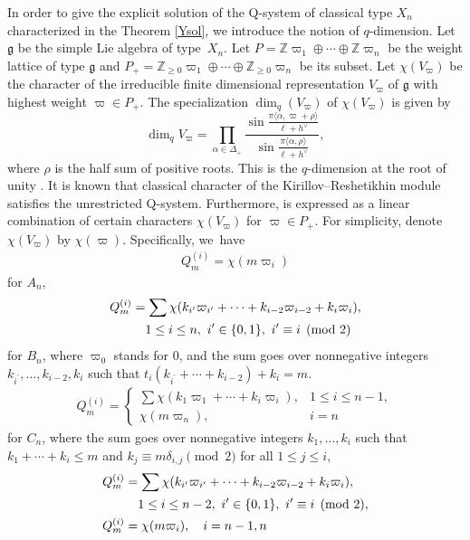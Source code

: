 \documentclass[pdftex]{sigma}
\numberwithin{equation}{section}
\newcommand{\Z}{{\mathbb Z}}
\newcommand{\geh}{\mathfrak{g}}
\newcommand{\op}{\oplus}
\newcommand{\pair}[1]{\langle{#1}\rangle}
\begin{document}
In order to give the explicit solution of the Q-system of classical type $X_n$ characterized in the Theorem \ref{Ysol}, we introduce the notion of $q$-dimension.
Let $\geh$ be the simple Lie algebra of type~$X_n$.
Let $P=\Z\varpi_1\op\cdots\op\Z\varpi_n$ be the weight lattice of type $\geh$ and $P_+=\Z_{\geq0}\varpi_1\op\cdots\op\Z_{\geq0}\varpi_n$ be its subset.
Let $\chi(V_\varpi)$ be the character of the irreducible finite dimensional representation $V_\varpi$ of $\geh$ with highest weight $\varpi\in P_+$.
The specialization $\dim_q(V_\varpi)$ of $\chi(V_\varpi)$ is given by \[
\dim\nolimits_qV_\varpi=\prod_{\alpha\in\Delta_+}\frac{\sin{\frac{\pi\pair{\alpha,\varpi+\rho}}{\ell+h^\vee}}}{\sin{\frac{\pi\pair{\alpha,\rho}}{\ell+h^\vee}}},
\]
where $\rho$ is the half sum of positive roots.
This is the $q$-dimension at the root of unity .
It is known that classical character of the Kirillov--Reshetikhin module  satisfies the unrestricted Q-system.
Furthermore,  is expressed as a linear combination of certain characters $\chi(V_\varpi)$ for $\varpi\in P_+$.
For simplicity, denote $\chi(V_\varpi)$ by $\chi(\varpi)$.
Specifically, we~have
	\begin{align}\label{QA}
	Q_m^{(i)}=\chi(m\varpi_i)
	\end{align}
for $A_n$,
	\begin{align}
	&Q_m^{(i)}=\sum\chi(k_{i^\prime}\varpi_{i^\prime}+\cdots+k_{i-2}\varpi_{i-2}+k_i\varpi_i),\nonumber\\
 & \hphantom{Q_m^{(i)}=}  1\leq i\leq n,\ i^\prime\in\{0,1\},\ i^\prime\equiv i\pmod{2}\label{QB}
	\end{align}
for $B_n$, where $\varpi_0$ stands for 0, and the sum goes over nonnegative integers $k_{i^\prime},\dots,k_{i-2},k_i$ such that $t_i(k_{i^\prime}+\cdots+k_{i-2})+k_i=m$.
	\begin{align}\label{QC}
	Q_m^{(i)}=\begin{cases}
		\sum\chi(k_1\varpi_1+\cdots+k_i\varpi_i),&1\leq i\leq n-1,\\
		\chi(m\varpi_n),&i=n
	\end{cases}
	\end{align}
for $C_n$, where the sum goes over nonnegative integers $k_1,\dots,k_i$ such that $k_1+\cdots+k_i\leq m$ and $k_j\equiv m\delta_{i,j}\pmod{2}$ for all $1\leq j\leq i$,
	\begin{align}\label{QD}
\begin{aligned}
&Q_m^{(i)}=\sum\chi(k_{i^\prime}\varpi_{i^\prime}+\cdots+k_{i-2}\varpi_{i-2}+k_i\varpi_i),\\
 &\hphantom{Q_m^{(i)}=} 1\leq i\leq n-2,\ i^\prime\in\{0,1\},\ i^\prime\equiv i\pmod{2}, \\
	&Q_m^{(i)}=\chi(m\varpi_i),\quad i=n-1,n
\end{aligned}
	\end{align}
\end{document}

